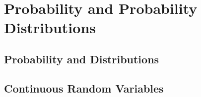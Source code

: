 \chapter{Probability and Probability Distributions}
\minitoc
\cleardoublepage
\section{Probability and Distributions}





\cleardoublepage\section{Continuous Random Variables}




